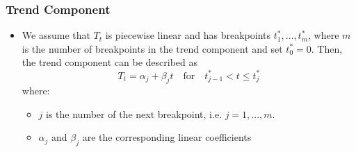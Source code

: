 \documentclass[presentation.tex]{subfiles}
\begin{document}
\begin{frame}
  \frametitle{Trend Component}
  \begin{itemize}
  \item 
  We assume that $T_t$ is piecewise linear and has breakpoints $t_1^*,\hdots, t_m^*$,
  where $m$ is the number of breakpoints in the trend component and set $t_0^* = 0$.
  Then, the trend component can be described as
  \[
  T_t = \alpha_j + \beta_j t \quad \text{for}\quad t^*_{j-1}<t\leq t_j^*
  \]
  where:
  \begin{itemize}
  \item $j$ is the number of the next breakpoint, i.e. $j = 1,...,m$.
  \item $\alpha_j$ and $\beta_j$ are the corresponding linear coefficients
  \end{itemize}
  \end{itemize}
\end{frame}
\end{document}
